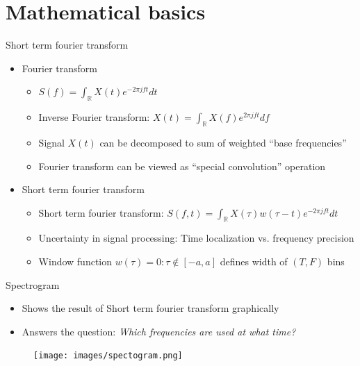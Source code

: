 \documentclass[xcolor=table,mathserif,9pt]{beamer}    %
\begin{document}
\section{Mathematical basics}%
\label{sec:mathematical_basics}
\begin{frame}{Short term fourier transform \cite{664179}}

\begin{itemize}
	\setlength\itemsep{1em}
	\item Fourier transform 
	\begin{itemize}
		\item $S(f) = \int_{\mathbb{R}}X(t)e^{-2{\pi}jft}dt$
		\item Inverse Fourier transform: $X(t) = \int_{\mathbb{R}}X(f)e^{2{\pi}jft}df$
		\item Signal $X(t)$ can be decomposed to sum of weighted ``base frequencies''
		\item Fourier transform can be viewed as ``special convolution'' operation
	\end{itemize}
	\item Short term fourier transform
	\begin{itemize}
		\item Short term fourier transform: $S(f,t) = \int_{\mathbb{R}}X(\tau)w(\tau - t)e^{-2{\pi}jft}dt$ 
		\item Uncertainty in signal processing: Time localization vs. frequency precision \cite{DBLP:journals/corr/Nam13}
		\item Window function $w(\tau) = 0: \tau \not \in \left[-a, a \right]$ defines width of $(T,F)$ bins 
	\end{itemize}
\end{itemize}

\end{frame}

\begin{frame}{Spectrogram}

\begin{itemize}
	\item Shows the result of Short term fourier transform graphically
	\item Answers the question: \emph{Which frequencies are used at what time?}
\end{itemize}

\begin{center}
	\begin{figure}
		\texttt{[image: images/spectogram.png]}
	\end{figure}
\end{center}

\end{frame}
\end{document}
